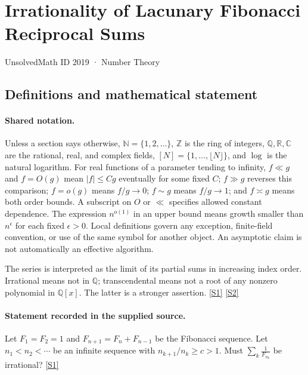 \documentclass[11pt,a4paper]{article}
\newcommand{\N}{\mathbb{N}}
\newcommand{\Z}{\mathbb{Z}}
\newcommand{\Q}{\mathbb{Q}}
\newcommand{\R}{\mathbb{R}}
\newcommand{\C}{\mathbb{C}}
\newcommand{\sref}[2]{\hyperlink{source:#1:#2}{[S#2]}}
\begin{document}

\setcounter{section}{2018}

\section{Irrationality of Lacunary Fibonacci Reciprocal Sums}\label{2019}

{\small\sffamily UnsolvedMath ID 2019 · Number Theory}

\subsection{Definitions and mathematical statement}

\paragraph{Shared notation.}Unless a section says otherwise, $\N=\{1,2,\ldots\}$,
$\Z$ is the ring of integers, $\Q,\R,\C$ are the rational, real, and complex
fields, $[N]=\{1,\ldots,\lfloor N\rfloor\}$, and $\log$ is the natural
logarithm. For real functions of a parameter tending to infinity,
$f\ll g$ and $f=O(g)$ mean $|f|\leq Cg$ eventually for some fixed $C$;
$f\gg g$ reverses this comparison; $f=o(g)$ means $f/g\to0$;
$f\sim g$ means $f/g\to1$; and $f\asymp g$ means both order bounds.
A subscript on $O$ or $\ll$ specifies allowed constant dependence.
The expression $n^{o(1)}$ in an upper bound means growth smaller than
$n^\epsilon$ for each fixed $\epsilon>0$. Local definitions govern any
exception, finite-field convention, or use of the same symbol for another
object. An asymptotic claim is not automatically an effective algorithm.



The series is interpreted as the limit of its partial sums in increasing index order. Irrational means not in $\Q$; transcendental means not a root of any nonzero polynomial in $\Q[x]$. The latter is a stronger assertion. \sref{2019}{1} \sref{2019}{2}

\paragraph{Statement recorded in the supplied source.}
Let $F_1=F_2=1$ and $F_{n+1}=F_n+F_{n-1}$ be the Fibonacci sequence. Let $n_1<n_2<\cdots $ be an infinite sequence with $n_{k+1}/n_k \geq c>1$. Must $ \sum_k\frac{1}{F_{n_k}} $ be irrational? \sref{2019}{1}
\end{document}
